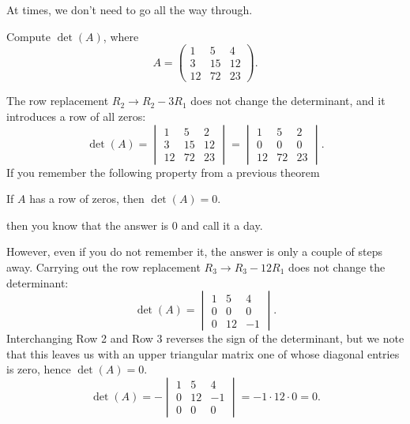 \documentclass{ximera}
\begin{document}
At times, we don't need to go all the way through.
\begin{example}
  Compute $\det(A)$, where
  \[
    A =
    \begin{pmatrix}
      1 & 5 & 4 \\
      3 & 15 & 12 \\
      12 & 72 & 23
    \end{pmatrix}.
  \]
  \begin{explanation}
    The row replacement $R_2 \to R_2 - 3R_1$ does not change the
    determinant, and it introduces a row of all zeros:
    \[
      \det(A) =
      \begin{vmatrix}
        1 & 5 & 2 \\
        3 & 15 & 12 \\
        12 & 72 & 23
      \end{vmatrix}
      =
      \begin{vmatrix}
        1 & 5 & 2 \\
        0 & 0 & 0 \\
        12 & 72 & 23
      \end{vmatrix}.
    \]
    If you remember the following property from a previous theorem
    \begin{center}
      If $A$ has a row of zeros, then $\det(A) =0$.
    \end{center}
    then you know that the answer is 0 and call it a day.

    However, even if you do not remember it, the answer is only a
    couple of steps away. Carrying out the row replacement
    $R_3 \to R_3 - 12 R_1$ does not change the determinant:
    \[
      \det(A) =
      \begin{vmatrix}
        1 & 5 & 4 \\
        0 & 0 & 0 \\
        0 & 12 & -1
      \end{vmatrix}.
    \]
    Interchanging Row 2 and Row 3 reverses the sign of the
    determinant, but we note that this leaves us with an upper
    triangular matrix one of whose diagonal entries is zero, hence
    $\det(A) = 0$.
    \[
      \det(A) = -
      \begin{vmatrix}
        1 & 5 & 4 \\
        0 & 12 & -1 \\
        0 & 0 & 0
      \end{vmatrix} = -1 \cdot 12 \cdot 0 = 0.
    \]
  \end{explanation}
\end{example}
\end{document}
